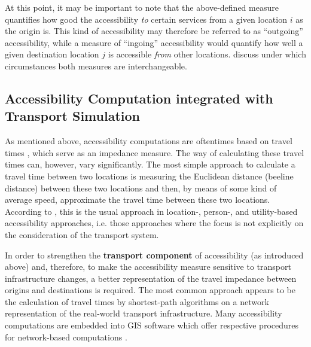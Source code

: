 At this point, it may be important to note that the above-defined measure quantifies how good the accessibility \textit{to} 
certain services from a given location $i$ as the origin is. This kind of accessibility may therefore be referred to 
as ``outgoing'' accessibility, while a measure of ``ingoing'' accessibility would quantify how well a given destination 
location $j$ is accessible \textit{from} other locations. \citet{NicolaiNagel2012HiResAccessibilityMethodInBook} 
discuss under which circumstances both measures are interchangeable.

\subsection{Accessibility Computation integrated with Transport Simulation}
As mentioned above, accessibility computations are oftentimes based on travel times 
\citep{BBSR20xxErreichbarkeitsmodell, BuettnerEtAl2010Erreichbarkeitsatlas}
, which serve as an impedance measure. The way of calculating these travel times can, however, vary significantly. 
The most simple approach to calculate a travel time between two locations is measuring the Euclidean distance 
(beeline distance) between these two locations and then, by means of some kind of average speed, approximate the 
travel time between these two locations. According to \citet{Geurs2004AccessibilityReview}, this is the usual 
approach in location-, person-, and utility-based accessibility approaches, i.e. those approaches where the focus 
is not explicitly on the consideration of the transport system.



In order to strengthen the \textbf{transport component} of accessibility (as introduced above) and, therefore, to 
make the accessibility measure sensitive to transport infrastructure changes, a better representation of the travel 
impedance between origins and destinations is required. The most common approach appears to be the calculation of 
travel times by shortest-path algorithms on a network representation of the real-world transport infrastructure.
Many accessibility computations are embedded into GIS software which offer respective procedures for network-based 
computations 
\citep{BBSR20xxErreichbarkeitsmodell, CurtisEtAl2013AccessibilityPolicyInnovation, BuettnerEtAl2010Erreichbarkeitsatlas}.


